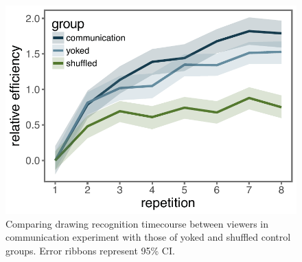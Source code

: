 \documentclass[10pt,letterpaper]{article}
\begin{document}






\begin{figure}
\begin{center}
\includegraphics[width=0.92 \linewidth]{figures/recog_BIS_timeseries.pdf}
\caption{Comparing drawing recognition timecourse between viewers in communication experiment with those of yoked and shuffled control groups. Error ribbons represent 95\% CI.}
\label{recog_bis}
\vspace{-1em}
\end{center}
\end{figure}
\end{document}
